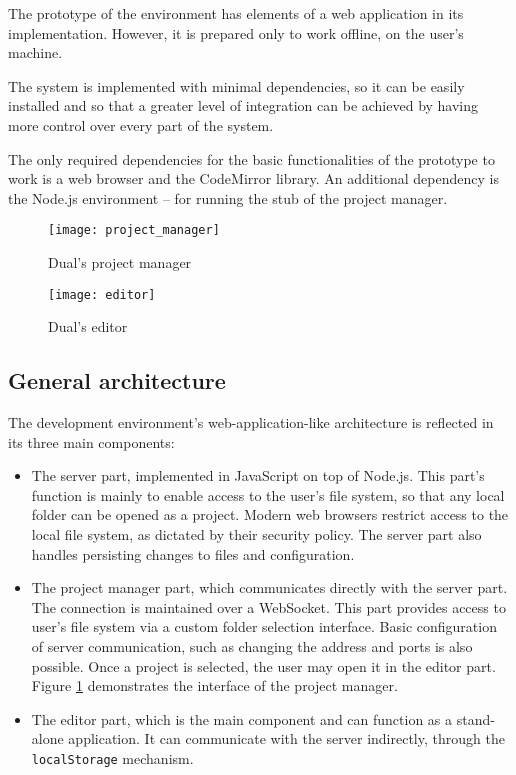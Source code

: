 The prototype of the environment has elements of a web application in its implementation. However, it is prepared only to work offline, on the user's machine.

The system is implemented with minimal dependencies, so it can be easily
installed and so that a greater level of integration can be achieved by having more control over every part of the system.

The only required dependencies for the basic functionalities of the prototype to
work is a web browser and the CodeMirror library. An additional dependency is the Node.js environment -- for running the stub of the project manager.

\begin{figure}[h!]
\centering \texttt{[image: project\_manager]}
\caption{Dual's project manager}
\label{fig:project_manager}
\end{figure}

\begin{figure}[h!]
\centering \texttt{[image: editor]}
\caption{Dual's editor}
\label{fig:editor}
\end{figure}

\subsection{General architecture}
The development environment's web-application-like architecture is reflected in its three main components:
\begin{itemize}
    \item The server part, implemented in JavaScript on top of Node.js. This
      part's function is mainly to enable access to the user's file system, so that any local folder can be opened as a project. Modern web browsers restrict access to the local file system, as dictated by their security policy. The server part also handles persisting changes to files and configuration.
    \item The project manager part, which communicates directly with the server
      part. The connection is maintained over a WebSocket\cite{mdn_websockets}. This part provides access to user's file system via a custom folder selection interface. Basic configuration of server communication, such as changing the address and ports is also possible. Once a project is selected, the user may open it in the editor part. Figure \ref{fig:project_manager} demonstrates the interface of the project manager.
    \item The editor part, which is the main component and can function as a
      stand-alone application. It can communicate with the server indirectly,
      through the \texttt{localStorage} mechanism\cite{mdn_localstorage}.
\end{itemize}

